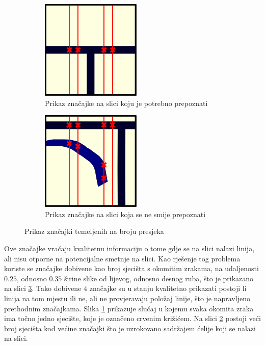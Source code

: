 \documentclass[times, utf8, zavrsni, numeric]{fer}
\begin{document}
\begin{figure}[th!]
    \centering
    \begin{subfigure}{.5\textwidth}
        \centering
        \includegraphics[width=.45\linewidth]{Images/Feature_true_2.png}
        \captionsetup{justification=centering}
        \caption{Prikaz značajke na slici koju je potrebno prepoznati}
        \label{fig:featureDemo2a}
    \end{subfigure}%
    \begin{subfigure}{.5\textwidth}
        \centering
        \includegraphics[width=.45\linewidth]{Images/Feature_false_2.png}
        \captionsetup{justification=centering}
        \caption{Prikaz značajke na slici koja se ne smije prepoznati}
        \label{fig:featureDemo2b}
    \end{subfigure}
    \caption{Prikaz značajki temeljenih na broju presjeka}
    \label{fig:featureDemo2}
\end{figure}

Ove značajke vraćaju kvalitetnu informaciju o tome gdje se na slici nalazi linija, ali nisu otporne na potencijalne smetnje na slici.
Kao rješenje tog problema koriste se značajke dobivene kao broj sjecišta s okomitim zrakama, na udaljenosti $0.25$, odnosno $0.35$ širine slike od lijevog, odnosno desnog ruba, što je prikazano na slici \ref{fig:featureDemo2}.
Tako dobivene $4$ značajke su u stanju kvalitetno prikazati postoji li linija na tom mjestu ili ne, ali ne provjeravaju položaj linije, što je napravljeno prethodnim značajkama.
Slika \ref{fig:featureDemo2a} prikazuje slučaj u kojemu svaka okomita zraka ima točno jedno sjecište, koje je označeno crvenim križićem.
Na slici \ref{fig:featureDemo2b} postoji veći broj sjecišta kod većine značajki što je uzrokovano sadržajem ćelije koji se nalazi na slici.\\
\end{document}
